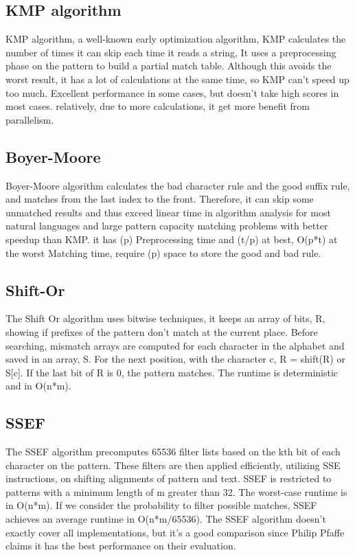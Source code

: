 \documentclass[11pt]{article}       %
\begin{document}
\subsection{KMP algorithm}\label{kmp}
KMP algorithm, a well-known early optimization algorithm, KMP calculates the number of times it can skip each time it reads a string, It uses a preprocessing phase on the pattern to build a partial match table. Although this avoids the worst result, it has a lot of calculations at the same time, so KMP can’t speed up too much. Excellent performance in some cases, but doesn’t take high scores in most cases. relatively, due to more calculations, it get more benefit from parallelism.

\subsection{Boyer-Moore}\label{bm}
Boyer-Moore algorithm calculates the bad character rule and the good suffix rule, and matches from the last index to the front. Therefore, it can skip some unmatched results and thus exceed linear time in algorithm analysis for most natural languages and large pattern capacity matching problems with better speedup than KMP. it has (p) Preprocessing time and  (t/p) at best, O(p*t) at the worst Matching time, require (p) space to store the good and bad rule.

\subsection{Shift-Or}\label{so}
The Shift Or algorithm uses bitwise techniques\cite{Matching}, it keeps an array of bits, R, showing if prefixes of the pattern don't match at the current place. Before searching, mismatch arrays are computed for each character in the alphabet and saved in an array, S. For the next position, with the character c, R = shift(R) or S[c]. If the last bit of R is 0, the pattern matches. The runtime is deterministic and in O(n*m).

\subsection{SSEF}\label{SSEF}
The SSEF algorithm precomputes 65536 filter lists based on the kth bit of each character on the pattern. These filters are then applied efficiently, utilizing SSE instructions, on shifting alignments of pattern and text. SSEF is restricted to patterns with a minimum length of m greater than 32. The worst-case runtime is in O(n*m). If we consider the probability to filter possible matches, SSEF achieves an average runtime in O(n*m/65536). The SSEF algorithm doesn't exactly cover all implementations, but it's a good comparison since Philip Pfaffe claims it has the best performance on their evaluation.
\end{document}
